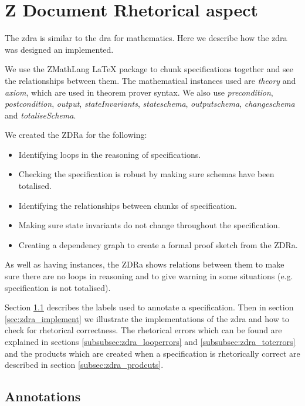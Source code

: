 \chapter{Z Document Rhetorical aspect}
\label{ch:zdra}
The \gls{zdra} is similar to the \gls{dra} for mathematics. Here we describe how
the \gls{zdra} was designed an implemented. 

We use the ZMathLang \LaTeX{} package to chunk specifications together and see
the relationships between them. The mathematical instances used are
\textit{theory} and \textit{axiom}, which are used in theorem prover syntax. We
also use \textit{precondition}, \textit{postcondition}, \textit{output},
\textit{stateInvariants}, \textit{stateschema}, \textit{outputschema},
\textit{changeschema} and \textit{totaliseSchema}.

We created the ZDRa for the following:

\begin{itemize}

\item Identifying loops in the reasoning of specifications.
\item Checking the specification is robust by making sure schemas have been
totalised.
\item Identifying the relationships between chunks of specification.
\item Making sure state invariants do not change throughout the specification.
\item Creating a dependency graph to create a formal proof sketch from the ZDRa.
\end{itemize}

As well as having instances, the ZDRa shows relations between them to make sure
there are no loops in reasoning and to give warning in some situations (e.g.
specification is not totalised).

Section \ref{sec:zdra_annotate} describes the labels used to annotate a
specification. Then in section \ref{sec:zdra_implement} we illustrate the
implementations of the \gls{zdra} and how to check for rhetorical correctness.
The rhetorical errors which can be found are explained in sections
\ref{subsubsec:zdra_looperrors} and \ref{subsubsec:zdra_toterrors} and the
products which are created when a specification is rhetorically correct are
described in section \ref{subsec:zdra_prodcuts}.

\section{Annotations}
\label{sec:zdra_annotate}


